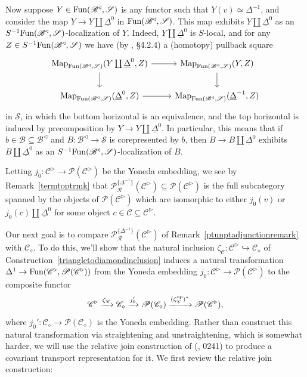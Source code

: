 \documentclass{tac}
\newcommand{\s}[1]{\mathscr{#1}}
\newcommand{\tx}[1]{\textnormal{#1}}
\newcommand{\ul}[1]{\underline{#1}}
\begin{document}
\begin{rmk}
Now suppose $Y \in \tx{Fun}( \s{B}^\triangleleft , \s{S})$ is any functor such that $Y(v) \simeq \Delta^{-1}$, and consider the map $Y \to Y \coprod \ul{\Delta}^0$ in $\tx{Fun}(\s{B}^\triangleleft , \s{S})$.  This map exhibits $Y \coprod \ul{\Delta}^0$ as an $S^{-1} \tx{Fun}(\s{B}^\triangleleft , \s{S})$-localization of $Y$.  Indeed, $Y \coprod \ul{\Delta}^0$ is $S$-local, and for any $Z \in S^{-1} \tx{Fun}(\s{B}^\triangleleft , \s{S})$ we have (by \cite{htt}, \S 4.2.4) a (homotopy) pullback square 
\[ \begin{tikzcd}
\tx{Map}_{\tx{Fun}( \s{B}^\triangleleft , \s{S})} (Y \coprod \ul{\Delta}^0 , Z) \arrow[]{r} \arrow[]{d} & \tx{Map}_{\tx{Fun}( \s{B}^\triangleleft , \s{S})} (Y,Z) \arrow[]{d} \\ 
\tx{Map}_{\tx{Fun}( \s{B}^\triangleleft , \s{S})} (\ul{\Delta}^0 , Z) \arrow[]{r} & \tx{Map}_{\tx{Fun}( \s{B}^\triangleleft , \s{S})} (\ul{\Delta}^{-1}, Z)
\end{tikzcd}\]
in $\s{S}$, in which the bottom horizontal is an equivalence, and the top horizontal is induced by precomposition by $Y \to Y \coprod \ul{\Delta}^0$.  In particular, this means that if $b \in \s{B} \subseteq \s{B}^\triangleleft$ and $B : \s{B}^\triangleleft \to\s{S}$ is corepresented by $b$, then $B \to B \coprod \ul{\Delta}^0$ exhibits $B \coprod \ul{\Delta}^0$ as an $S^{-1} \tx{Fun}(\s{B}^\triangleleft , \s{S})$-localization of $B$.

Letting $j_0 : \s{C}^\triangleright \to\s{P}(\s{C}^\triangleright )$ be the Yoneda embedding, we see by Remark~\ref{termtoptrmk} that $ \s{P}^{\{ \Delta^{-1} \}}_{\s{R}}(\s{C}^\triangleright) \subseteq \s{P}(\s{C}^\triangleright)$ is the full subcategory spanned by the objects of $\s{P}(\s{C}^\triangleright)$ which are isomorphic to either $j_0 (v)$ or $j_0 (c) \coprod \ul{\Delta}^0$ for some object $c \in \s{C} \subseteq \s{C}^\triangleright$.
\end{rmk}
Our next goal is to compare $\s{P}^{\{ \Delta^{-1} \}}_{\s{R}}(\s{C}^\triangleright)$ of Remark~\ref{ptunptadjunctionremark} with $\s{C}_\diamond$.  To do this, we'll show that the natural inclusion $\zeta_\s{C} : \s{C}^\triangleright \hookrightarrow \s{C}_\diamond$ of Construction~\ref{triangletodiamondinclusion} induces a natural transformation $\Delta^1 \to \tx{Fun}(\s{C}^\triangleright , \s{P}(\s{C}^\triangleright))$ %
 from the Yoneda embedding $j_0 : \s{C}^\triangleright \to \s{P}(\s{C}^\triangleright)$ to the composite functor \[ \s{C}^\triangleright \xrightarrow{\zeta_\s{C}} \s{C}_\diamond \xrightarrow{j_0'} \s{P}(\s{C}_\diamond) \xrightarrow{(\zeta_\s{C}^\tx{op})^*} \s{P}(\s{C}^\triangleright),\] where $j_0' : \s{C}_\diamond \rightarrow \s{P}(\s{C}_\diamond)$ is the Yoneda embedding.  Rather than construct this natural transformation via straightening and unstraightening, which is somewhat harder, we will use the relative join construction of (\cite{kerodon}, 0241) to produce a covariant transport representation for it.  We first review the relative join construction:
\end{document}
